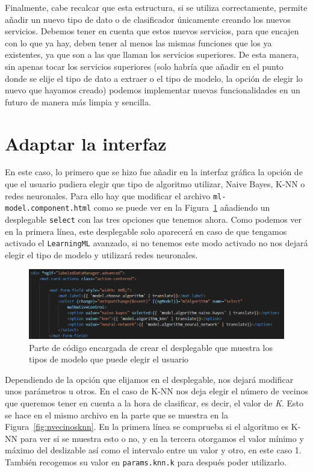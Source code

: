 \documentclass[a4paper, 12pt]{book}
\begin{document}
Finalmente, cabe recalcar que esta estructura, si se utiliza correctamente, permite añadir un nuevo tipo de dato o de clasificador únicamente creando los nuevos servicios. Debemos tener en cuenta que estos nuevos servicios, para que encajen con lo que ya hay, deben tener al menos las mismas funciones que los ya existentes, ya que son a las que llaman los servicios superiores. De esta manera, sin apenas tocar los servicios superiores (solo habría que añadir en el punto donde se elije el tipo de dato a extraer o el tipo de modelo, la opción de elegir lo nuevo que hayamos creado) podemos implementar nuevas funcionalidades en un futuro de manera más limpia y sencilla.



\section{Adaptar la interfaz} 
\label{sec:interfaz}

En este caso, lo primero que se hizo fue añadir en la interfaz gráfica la opción de que el usuario pudiera elegir que tipo de algoritmo utilizar, Naive Bayes, K-NN o redes neuronales. Para ello hay que modificar el archivo \texttt{ml-model.component.html} como se puede ver en la Figura~\ref{fig:desplegable} añadiendo un desplegable \texttt{select} con las tres opciones que tenemos ahora. Como podemos ver en la primera línea, este desplegable solo aparecerá en caso de que tengamos activado el \texttt{LearningML} avanzado, si no tenemos este modo activado no nos dejará elegir el tipo de modelo y utilizará redes neuronales.\\

\begin{figure}
	\centering
	\includegraphics[width=12cm, keepaspectratio]{img/desplegable}
	\caption{Parte de código encargada de crear el desplegable que muestra los tipos de modelo que puede elegir el usuario}									\label{fig:desplegable}
\end{figure}

Dependiendo de la opción que elijamos en el desplegable, nos dejará modificar unos parámetros u otros. 
En el caso de K-NN nos deja elegir el número de vecinos que queremos tener en cuenta a la hora de clasificar, es decir, el valor de \emph{K}. Esto se hace en el mismo archivo en la parte que se muestra en la Figura~\ref{fig:nvecinosknn}. En la primera línea se comprueba si el algoritmo es K-NN para ver si se muestra esto o no, y en la tercera otorgamos el valor mínimo y máximo del deslizable así como el intervalo entre un valor y otro, en este caso 1. También recogemos su valor en \texttt{params.knn.k} para después poder utilizarlo.
\end{document}

